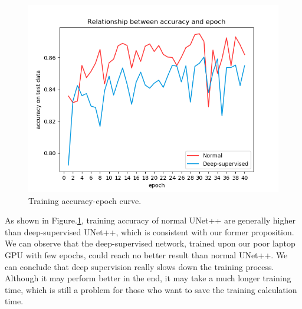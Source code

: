 \begin{figure}[!htpb]
\centering
\includegraphics[scale=0.3]{figuras/unetppTraining.png}
\caption{Training accuracy-epoch curve.}
\label{fig:unetppTrain}
\end{figure}

As shown in Figure.\ref{fig:unetppTrain}, training accuracy of normal UNet++ are generally higher than deep-supervised UNet++, which is consistent with our former proposition. We can observe that the deep-supervised network, trained upon our poor laptop GPU with few epochs, could reach no better result than normal UNet++. We can conclude that deep supervision really slows down the training process. Although it may perform better in the end, it may take a much longer training time, which is still a problem for those who want to save the training calculation time.
